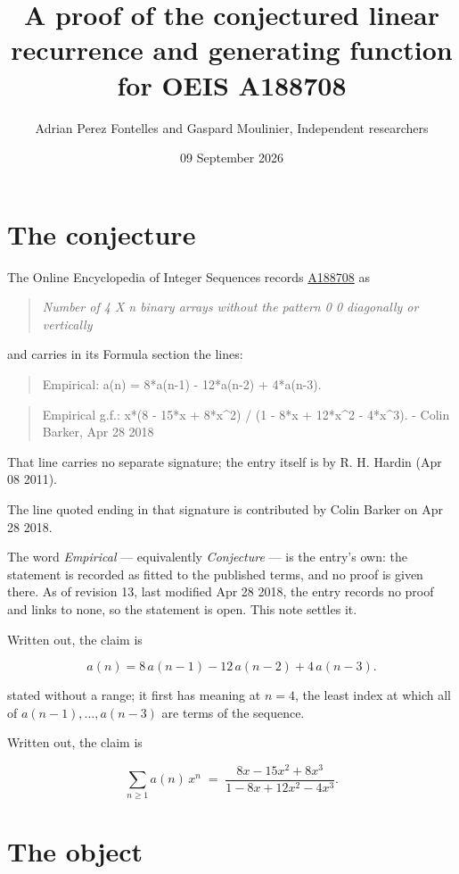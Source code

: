 \documentclass[11pt]{article}
\title{A proof of the conjectured linear recurrence and generating function for OEIS A188708}
\author{Adrian Perez Fontelles and Gaspard Moulinier, Independent researchers}
\date{09 September 2026}
\theoremstyle{definition}
\begin{document}
\maketitle
\section{The conjecture}

The Online Encyclopedia of Integer Sequences records \href{https://oeis.org/A188708}{A188708} as

\begin{quote}\itshape Number of 4 X n binary arrays without the pattern 0 0 diagonally or vertically\end{quote}

and carries in its Formula section the lines:

\begin{quote}\ttfamily Empirical: a(n) = 8*a(n-1) - 12*a(n-2) + 4*a(n-3).\end{quote}

\begin{quote}\ttfamily Empirical g.f.: x*(8 - 15*x + 8*x\textasciicircum{}2) / (1 - 8*x + 12*x\textasciicircum{}2 - 4*x\textasciicircum{}3). - Colin Barker, Apr 28 2018\end{quote}

That line carries no separate signature; the entry itself is by R. H. Hardin (Apr 08 2011).

The line quoted ending in that signature is contributed by Colin Barker on Apr 28 2018.

The word {\itshape Empirical} --- equivalently {\itshape Conjecture} --- is the entry's own: the statement is recorded as fitted to the published terms, and no proof is given there. As of revision 13, last modified Apr 28 2018, the entry records no proof and links to none, so the statement is open. This note settles it.

Written out, the claim is

\[a(n) = 8\,a(n-1) - 12\,a(n-2) + 4\,a(n-3).\]

stated without a range; it first has meaning at $n = 4$, the least index at which all of $a(n-1),\dots,a(n-3)$ are terms of the sequence.

Written out, the claim is

\[\sum_{n \ge 1} a(n)\,x^n \;=\; \frac{8x - 15x^{2} + 8x^{3}}{1 - 8x + 12x^{2} - 4x^{3}}.\]

\section{The object}
\end{document}
